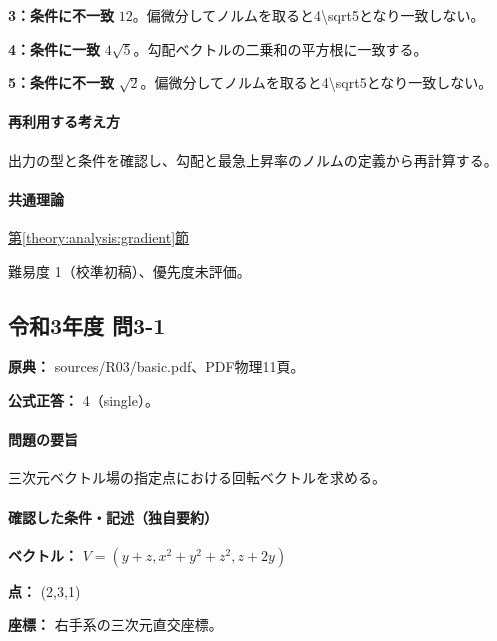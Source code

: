 \noindent\textbf{3：条件に不一致} \(12\)。偏微分してノルムを取ると4\textbackslash{}sqrt5となり一致しない。\par

\noindent\textbf{4：条件に一致} \(4\sqrt5\)。勾配ベクトルの二乗和の平方根に一致する。\par

\noindent\textbf{5：条件に不一致} \(\sqrt2\)。偏微分してノルムを取ると4\textbackslash{}sqrt5となり一致しない。\par

\paragraph{再利用する考え方} 出力の型と条件を確認し、勾配と最急上昇率のノルムの定義から再計算する。

\paragraph{共通理論} \hyperref[theory:analysis:gradient]{第\ref*{theory:analysis:gradient}節}

\par 難易度 1（校準初稿）、優先度未評価。

\subsection{令和3年度 問3-1}
\label{q:r03-reg-basic-3-1}

\noindent\textbf{原典：} sources/R03/basic.pdf、PDF物理11頁。

\textbf{公式正答：} 4（single）。

\paragraph{問題の要旨} 三次元ベクトル場の指定点における回転ベクトルを求める。

\paragraph{確認した条件・記述（独自要約）}\mbox{}\par

\noindent\textbf{ベクトル：} \(V=(y+z,x^2+y^2+z^2,z+2y)\)\par

\noindent\textbf{点：} (2,3,1)\par

\noindent\textbf{座標：} 右手系の三次元直交座標。\par

